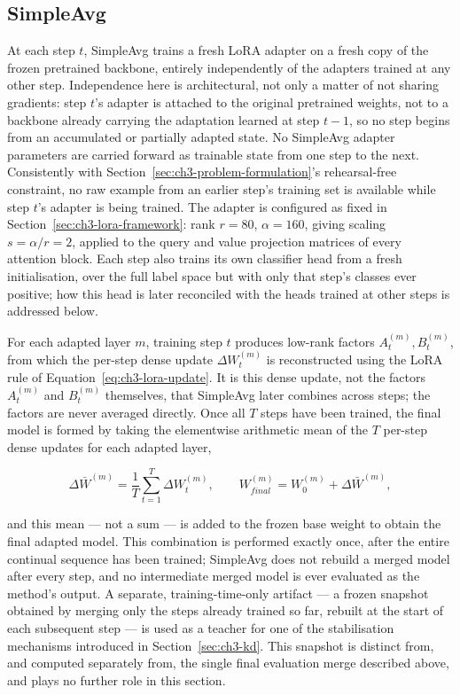 \subsection{SimpleAvg}
\label{sec:ch3-simpleavg}

At each step $t$, SimpleAvg trains a fresh LoRA adapter on a fresh copy of
the frozen pretrained backbone, entirely independently of the adapters
trained at any other step. Independence here is architectural, not only a
matter of not sharing gradients: step $t$'s adapter is attached to the
original pretrained weights, not to a backbone already carrying the
adaptation learned at step $t-1$, so no step begins from an accumulated
or partially adapted state. No SimpleAvg adapter parameters are carried
forward as trainable state from one step to the next. Consistently with
Section~\ref{sec:ch3-problem-formulation}'s rehearsal-free
constraint, no raw example from an earlier step's training set is
available while step $t$'s adapter is being trained. The adapter is
configured as fixed in Section~\ref{sec:ch3-lora-framework}: rank $r=80$, $\alpha=160$, giving
scaling $s=\alpha/r=2$, applied to the query and value projection matrices
of every attention block. Each step also trains its own classifier head
from a fresh initialisation, over the full label space but with only that
step's classes ever positive; how this head is later reconciled with the
heads trained at other steps is addressed below.

For each adapted layer $m$, training step $t$ produces low-rank factors
$A_t^{(m)}, B_t^{(m)}$, from which the per-step dense update
$\Delta W_t^{(m)}$ is reconstructed using the LoRA rule of
Equation~\eqref{eq:ch3-lora-update}. It is this dense update, not the factors $A_t^{(m)}$ and $B_t^{(m)}$
themselves, that SimpleAvg later combines across steps; the factors are
never averaged directly. Once all $T$ steps have been trained, the final
model is formed by taking the elementwise arithmetic mean of the $T$
per-step dense updates for each adapted layer,

\begin{equation}
\label{eq:ch3-simpleavg-merge}
\Delta \bar{W}^{(m)} = \frac{1}{T} \sum_{t=1}^{T} \Delta W_t^{(m)},
\qquad
W_{final}^{(m)} = W_0^{(m)} + \Delta \bar{W}^{(m)},
\end{equation}

and this mean --- not a sum --- is added to the frozen base weight to obtain
the final adapted model. This combination is performed exactly once, after
the entire continual sequence has been trained; SimpleAvg does not rebuild
a merged model after every step, and no intermediate merged model is ever
evaluated as the method's output. A separate, training-time-only
artifact --- a frozen snapshot obtained by merging only the steps already
trained so far, rebuilt at the start of each subsequent step --- is used as
a teacher for one of the stabilisation mechanisms introduced in Section~\ref{sec:ch3-kd}.
This snapshot is distinct from, and computed separately from, the
single final evaluation merge described above, and plays no further role
in this section.


